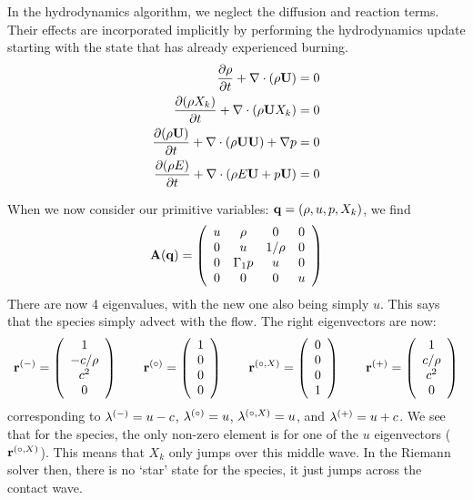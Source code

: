In the hydrodynamics algorithm, we neglect the diffusion and reaction terms.  Their
effects are incorporated implicitly by performing the hydrodynamics
update starting with the state that has already experienced burning.
\begin{align}
{\frac{{\partial\rho}}{\partial t}} + \nabla \cdot (\rho {\bf U}) &= 0 \\
{\frac{{\partial(\rho X_k)}}{\partial t}} + \nabla \cdot (\rho {\bf U} X_k) &= 0 \\
{\frac{{\partial(\rho {\bf U})}}{\partial t}} + \nabla \cdot (\rho {\bf U} {\bf U}) + \nabla p &= 0 \\
{\frac{{\partial(\rho E)}}{\partial t}} + \nabla \cdot (\rho E {\bf U} + p {\bf U} ) &= 0
\end{align}



When we now consider our primitive variables: ${\bf q} = (\rho, u, p, X_k)$,
we find
\begin{equation}
{\bf A}({\bf q}) = \left ( \begin{array}{cccc} u  & \rho     & 0      &  0\\
                                  0  &  u       & 1/\rho &  0\\
                                  0  & \Gamma_1 p & u      &  0\\
                                  0  & 0        & 0      & u \end{array} \right )
\end{equation}
There are now 4 eigenvalues, with the new one also being simply $u$.
This says that the species simply advect with the flow.  The right
eigenvectors are now:
\begin{equation}
\rb^\evm = \left ( \begin{array}{c} 1 \\ -c/\rho \\ c^2 \\ 0\end{array} \right )
%
\qquad
\rb^\evz = \left ( \begin{array}{c} 1 \\ 0 \\ 0  \\ 0\end{array} \right )
%
\qquad
\rb^\evzs{X} = \left ( \begin{array}{c} 0 \\ 0  \\ 0 \\ 1 \end{array} \right )
%
\qquad
\rb^\evp = \left ( \begin{array}{c} 1 \\ c/\rho \\ c^2 \\ 0 \end{array} \right )
\end{equation}
corresponding to $\lambda^{(-)} = u -c$, $\lambda^{(\circ)} = u$,
$\lambda^{(\circ,X)} = u$, and $\lambda^{(+)} = u + c$.  We see that for
the species, the only non-zero element is for one of the $u$
eigenvectors (${\bf r}^{(\circ,X)}$).  This means that $X_k$ only jumps over
this middle wave.  In the Riemann solver then, there is no `star'
state for the species, it just jumps across the contact wave.


